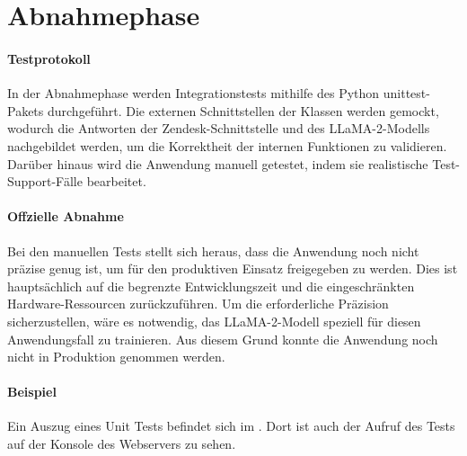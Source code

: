 \section{Abnahmephase} 
\label{sec:Abnahmephase}

\paragraph{Testprotokoll} 
In der Abnahmephase werden Integrationstests mithilfe des Python unittest-Pakets 
durchgeführt. Die externen Schnittstellen der Klassen werden gemockt,
wodurch die Antworten der Zendesk-Schnittstelle und des \ac{LLaMA}-2-Modells
nachgebildet werden, um die Korrektheit der internen Funktionen zu validieren. 
Darüber hinaus wird die Anwendung manuell getestet, indem sie realistische Test-Support-Fälle bearbeitet.


\paragraph{Offzielle Abnahme}
Bei den manuellen Tests stellt sich heraus, dass die Anwendung noch 
nicht präzise genug ist, um für den produktiven Einsatz freigegeben zu werden. 
Dies ist hauptsächlich auf die begrenzte Entwicklungszeit und die 
eingeschränkten Hardware-Ressourcen zurückzuführen. 
Um die erforderliche Präzision sicherzustellen, wäre es notwendig, 
das \ac{LLaMA}-2-Modell speziell für diesen Anwendungsfall zu trainieren.
Aus diesem Grund konnte die Anwendung noch nicht in Produktion genommen werden.


\paragraph{Beispiel}
Ein Auszug eines Unit Tests befindet sich im . Dort ist auch der Aufruf des Tests auf der Konsole des Webservers zu sehen.
 
